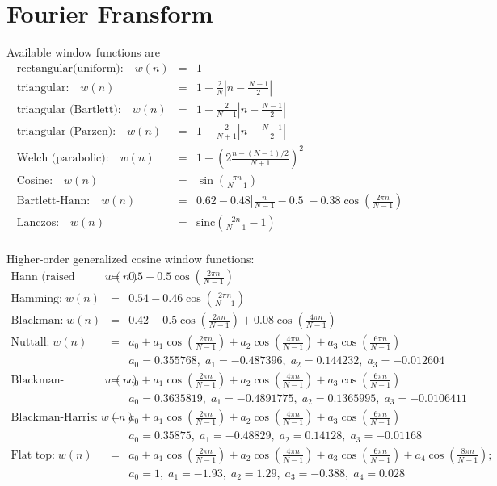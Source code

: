 \section{Fourier Fransform}
Available window functions are
\begin{eqnarray*}
\text{rectangular(uniform):} \quad  w(n) &=& 1 \\
\text{triangular:} \quad w(n) &=& 1 - \frac{2}{N} \left| n-\frac{N-1}{2} \right| \\
\text{triangular (Bartlett):} \quad  w(n) &=&  1 - \frac{2}{N-1} \left|n-\frac{N-1}{2}\right| \\
\text{triangular (Parzen):} \quad  w(n) &=& 1 - \frac{2}{N+1} \left| n-\frac{N-1}{2} \right| \\
\text{Welch (parabolic):} \quad  w(n) &=& 1 - \left(2 \frac{n-(N-1)/2}{N+1} \right)^2 \\
\text{Cosine:} \quad  w(n) &=& \sin\left( \frac{\pi n}{N-1} \right) \\
\text{Bartlett-Hann:} \quad  w(n) &=& 0.62 - 0.48 \left| \frac{n}{N-1}-0.5 \right| - 0.38 \cos\left(\frac{2\pi n}{N-1}\right) \\
\text{Lanczos:} \quad  w(n) &=& \mathrm{sinc} \left(\frac{2n}{N-1}-1\right) \\
\end{eqnarray*}

Higher-order generalized cosine window functions:
\begin{eqnarray*}
\text{Hann (raised cosine):} \;  w(n) &=& 0.5 - 0.5 \cos \left(\frac{2 \pi n}{N-1}\right) \\
%
\text{Hamming:} \;  w(n) &=& 0.54 - 0.46 \cos\left( \frac{2\pi n}{N-1} \right) \\
%
\text{Blackman:} \;  w(n) &=& 0.42 - 0.5 \cos\left(\frac{2\pi n}{N-1}\right) + 0.08 \cos\left(\frac{4\pi n}{N-1} \right) \\
%
\text{Nuttall:} \;  w(n) &=& a_0 + a_1 \cos\left(\frac{2\pi n}{N-1}\right) + a_2 \cos\left(\frac{4\pi n}{N-1}\right) + a_3 \cos\left(\frac{6\pi n}{N-1}\right) \\
&& a_0 = 0.355768,\; a_1 =  -0.487396,\; a_2 = 0.144232,\; a_3 = -0.012604 \\
%
\text{Blackman-Nuttall:} \;  w(n) &=& a_0 + a_1 \cos\left(\frac{2\pi n}{N-1}\right) + a_2 \cos\left(\frac{4\pi n}{N-1}\right) + a_3 \cos\left(\frac{6\pi n}{N-1}\right) \\
&& a_0 = 0.3635819,\; a_1 =  -0.4891775,\; a_2 = 0.1365995,\; a_3 = -0.0106411 \\
%
\text{Blackman-Harris:} \;  w(n) &=& a_0 + a_1 \cos\left(\frac{2\pi n}{N-1}\right) + a_2 \cos\left(\frac{4\pi n}{N-1}\right) + a_3 \cos\left(\frac{6\pi n}{N-1}\right) \\
&& a_0 = 0.35875,\; a_1 =  -0.48829,\; a_2 = 0.14128,\; a_3 = -0.01168 \\
%
\text{Flat top:} \;  w(n) &=& a_0 + a_1 \cos\left(\frac{2\pi n}{N-1}\right) + a_2 \cos\left(\frac{4\pi n}{N-1}\right) +a_3 \cos\left(\frac{6\pi n}{N-1}\right) + a_4 \cos\left(\frac{8\pi n}{N-1}\right); \\
&& a_0 = 1, \; a_1 =  -1.93,\; a_2 = 1.29,\; a_3 = -0.388,\; a_4 = 0.028 \\
\end{eqnarray*}


